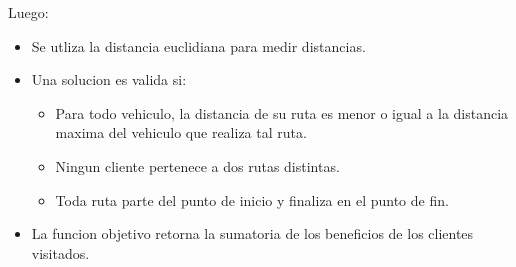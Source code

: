 \bigskip

\begin{minipage}{\textwidth}
Luego:

\begin{itemize}
	\item Se utliza la distancia euclidiana para medir distancias.
	\item Una solucion es valida si:
	\begin{itemize}
		\item Para todo vehiculo, la distancia de su ruta es menor o igual a la distancia maxima del vehiculo que realiza tal ruta.
		\item Ningun cliente pertenece a dos rutas distintas.
		\item Toda ruta parte del punto de inicio y finaliza en el punto de fin.
	\end{itemize}
	\item La funcion objetivo retorna la sumatoria de los beneficios de los clientes visitados.
\end{itemize}
\end{minipage}





























